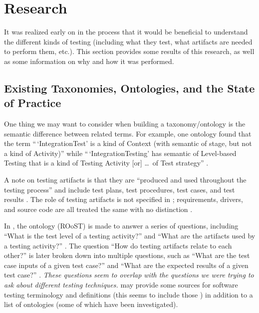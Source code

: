 \chapter{Research}
\label{chap:testing}

It was realized early on in the process that it would be beneficial to
understand the different kinds of testing (including what they test, what
artifacts are needed to perform them, etc.). This section provides some results
of this research, as well as some information on why and how it was performed.

\section{Existing Taxonomies, Ontologies, and the State of Practice}

One thing we may want to consider when building a taxonomy/ontology is the
semantic difference between related terms. For example, one ontology found
that the term ``\,`IntegrationTest' is a kind of Context (with
semantic of stage, but not a kind of Activity)'' while ``\,`IntegrationTesting'
has semantic of Level-based Testing that is a kind of Testing Activity [or]
\dots\ of Test strategy'' \citep[p.~157]{TebesEtAl2019}.

A note on testing artifacts is that they are ``produced and used throughout
the testing process'' and include test plans, test procedures, test cases, and
test results \citep[p.~3]{SouzaEtAl2017}. The role of testing
artifacts is not specified in \citep{BarbosaEtAl2006};
requirements, drivers, and source code are all treated the same
with no distinction \citep[p.~3]{BarbosaEtAl2006}.

In \citep{SouzaEtAl2017}, the ontology (ROoST)  is made to
answer a series of questions, including ``What is the test level of a testing
activity?'' and ``What are the artifacts used by a testing activity?''
\citep[pp.~8-9]{SouzaEtAl2017}.
The question ``How do testing artifacts relate to each other?''
\citep[p.~8]{SouzaEtAl2017} is later broken down into multiple questions,
such as ``What are the test case inputs of a given test case?'' and ``What are
the expected results of a given test case?'' \citep[p.~21]{SouzaEtAl2017}.
\emph{These questions seem to overlap with the questions we were trying to ask
    about different testing techniques.} \citet[pp.~152-153]{TebesEtAl2019} may
provide some sources for software testing terminology and definitions
(this seems to include those \suggSrcs{}) in addition to a list of ontologies
(some of which have been investigated).

